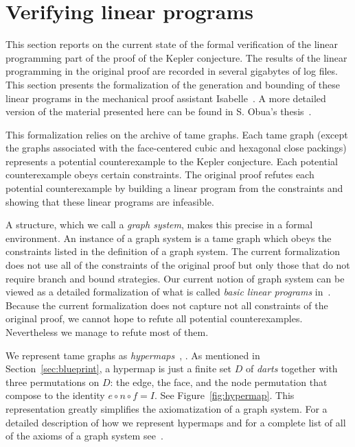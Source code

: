 \documentclass[11pt]{amsart}
\begin{document}
\section{Verifying linear programs}
\label{sec:lp}

This section reports on the current state of the formal verification of
the linear programming part of the proof of the Kepler conjecture.
The results of the linear programming in the original proof are recorded
in several gigabytes of log files.
This section presents the formalization of the generation and bounding of these linear programs 
in the mechanical proof assistant Isabelle~\cite{LNCS2283}. 
A more detailed version of the material presented here can be found in S. Obua's thesis~\cite{obua:phd}.

This formalization relies on the archive of tame graphs. Each tame graph (except the graphs associated with the face-centered cubic and hexagonal close packings) represents a potential counterexample to the Kepler conjecture. 
Each potential counterexample  obeys certain constraints.  The original
proof refutes each potential counterexample by building a linear program
from the constraints and showing that these linear programs are infeasible.

A structure, which we call a \emph{graph system}, makes this precise
in a formal environment.
An instance of a graph system is a tame graph which obeys the constraints listed in the definition of a graph system.
The current formalization does not use all of the constraints of the original proof but only those that do not require branch and bound strategies. Our current notion of graph system can be viewed
as a detailed formalization of what is called \emph{basic linear programs} in~\cite[\S 23.3]{Hales:2006:DCG}. 
Because the current formalization does not capture not all constraints of the original proof, we cannot hope to refute all potential counterexamples. Nevertheless we manage to refute most of them.

We represent tame graphs as \emph{hypermaps}~\cite{gonthier:2008:formal}, \cite{hales:2008:blueprint}. As mentioned in Section~\ref{sec:blueprint}, 
a hypermap is just a finite set $D$ of \emph{darts} together
with three permutations on $D$: the edge, the face, and the node permutation that compose to the identity $e\circ n\circ f = I$.   See Figure~\ref{fig:hypermap}.
This representation greatly simplifies
the axiomatization of a graph system. For a detailed description of how we represent 
hypermaps and for a complete list of all of the axioms of a graph system see~\cite[\S4]{obua:phd}.
\end{document}
